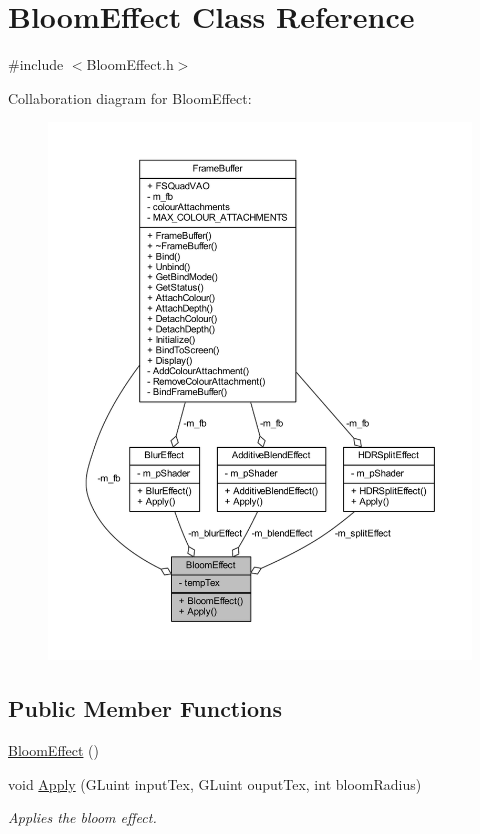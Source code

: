\hypertarget{class_bloom_effect}{}\section{Bloom\+Effect Class Reference}
\label{class_bloom_effect}


{\ttfamily \#include $<$Bloom\+Effect.\+h$>$}



Collaboration diagram for Bloom\+Effect\+:\nopagebreak
\begin{figure}[H]
\begin{center}
\leavevmode
\includegraphics[width=350pt]{class_bloom_effect__coll__graph}
\end{center}
\end{figure}
\subsection*{Public Member Functions}
\begin{DoxyCompactItemize}
\item 
\hyperlink{class_bloom_effect_ae76d6ede7ad9201f6bf8f4c9927c827b}{Bloom\+Effect} ()
\item 
void \hyperlink{class_bloom_effect_ace516d6debe768f05d147089f6927026}{Apply} (G\+Luint input\+Tex, G\+Luint ouput\+Tex, int bloom\+Radius)
\begin{DoxyCompactList}\small\item\em Applies the bloom effect. \end{DoxyCompactList}\end{DoxyCompactItemize}
